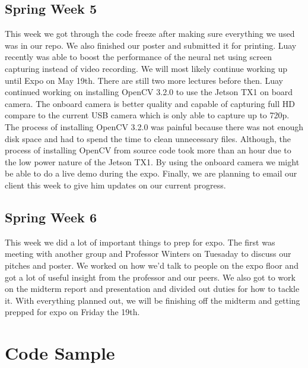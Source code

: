 \documentclass[onecolumn, draftclsnofoot,10pt, compsoc]{IEEEtran}
\begin{document}
\subsection{Spring Week 5}
This week we got through the code freeze after making sure everything we used was in our repo.
We also finished our poster and submitted it for printing.
Luay recently was able to boost the performance of the neural net using screen capturing instead of video recording.
We will most likely continue working up until Expo on May 19th.
There are still two more lectures before then.
\newline\newline
Luay continued working on installing OpenCV 3.2.0 to use the Jetson TX1 on board camera.
The onboard camera is better quality and capable of capturing full HD compare to the current USB camera which is only able to capture up to 720p.
The process of installing OpenCV 3.2.0 was painful because there was not enough disk space and had to spend the time to clean unnecessary files.
Although, the process of installing OpenCV from source code took more than an hour due to the low power nature of the Jetson TX1.
By using the onboard camera we might be able to do a live demo during the expo.
Finally, we are planning to email our client this week to give him updates on our current progress.

\subsection{Spring Week 6}
This week we did a lot of important things to prep for expo.
The first was meeting with another group and Professor Winters on Tuesaday to discuss our pitches and poster.
We worked on how we'd talk to people on the expo floor and got a lot of useful insight from the professor and our peers.
We also got to work on the midterm report and presentation and divided out duties for how to tackle it.
With everything planned out, we will be finishing off the midterm and getting prepped for expo on Friday the 19th.

\section{Code Sample}
\end{document}
